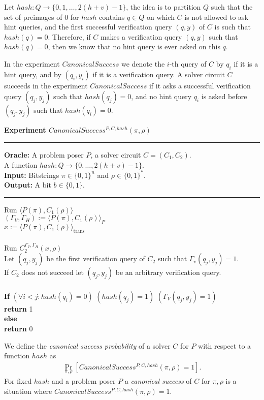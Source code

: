 
Let $hash:Q\rightarrow\{0,1,\dots, 2(h+v)-1\}$,
the idea is to partition $Q$ such that the set of preimages of $0$ for $hash$ contains $q \in Q$ on which $C$ is not allowed to ask hint queries,
and the first successful verification query $(q,y)$ of $C$ is such that $hash(q) = 0$.
Therefore, if $C$ makes a verification query $(q,y)$ such that $hash(q) = 0$, then we know that no hint query is ever asked on this $q$.

In the experiment $CanonicalSuccess$ we denote the $i$-th query of $C$ by $q_i$ if it is a hint query, and by $(q_i, y_i)$ if it is a verification query.
A solver circuit $C$ succeeds in the experiment $CanonicalSuccess$ if it asks a successful verification query $(q_j, y_j)$ such that $hash(q_j) = 0$,
and no hint query $q_i$ is asked before $(q_j, y_j)$ such that $hash(q_i) = 0$.
%
\begin{codeblock}
  \textbf{Experiment $CanonicalSuccess^{P, C, hash}(\pi, \rho)$}
  \medskip

  \hrule

  \medskip
  \textbf{Oracle:} A problem poser $P$, a solver circuit $C = (C_1, C_2)$.\\
  \IndII A function $hash: Q \rightarrow \{0, \dots, 2(h+v) - 1\}$.\\
  \textbf{Input:}  Bitstrings $\pi \in \{0,1\}^n$ and $\rho \in \{0,1\}^*$. \\
  \textbf{Output:} A bit $b \in \{0,1\}$.

  \medskip\hrule\medskip
  Run $\langle P(\pi), C_1(\rho) \rangle$ \\
  \IndI $(\Gamma_V, \Gamma_H) := \langle P(\pi), C_1(\rho) \rangle_{P}$ \\
  \IndI $x := \langle P(\pi), C_1(\rho) \rangle_{\text{trans}}$ \\ \\
  Run $C_2^{\Gamma_V, \Gamma_H} (x, \rho)$ \\
  \IndI Let $(q_j,y_j)$ be the first verification query of $C_2$ such that $\Gamma_v(q_j, y_j) = 1$.\\
  \IndI If $C_2$ does not succeed let $(q_j, y_j)$ be an arbitrary verification query.\\
  \\
  \textbf{If} $(\forall i < j :  hash(q_i) = 0)$ \And $(hash(q_j) = 1)$ \And $(\Gamma_V(q_j, y_j) = 1)$ \then \\
  \IndI \textbf{return} 1\\
  \textbf{else}\\
  \IndI \textbf{return} 0
\end{codeblock}
%
We define the \textit{canonical success probability} of a solver $C$ for $P$ with respect to a function $hash$ as
\begin{align}
 \underset{\pi, \rho}{\Pr}[CanonicalSuccess^{P, C, hash}(\pi, \rho) = 1].
\end{align}
%
For fixed $hash$ and a problem poser $P$ a \textit{canonical success} of $C$ for $\pi, \rho$ is a situation where $CanonicalSuccess^{P, C, hash}(\pi, \rho) = 1$.

